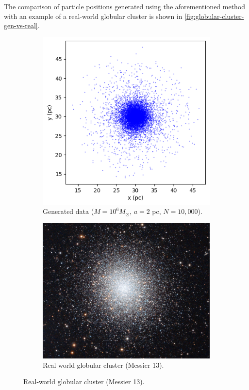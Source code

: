 The comparison of particle positions generated using the aforementioned method with an example of a real-world globular cluster is shown in \autoref{fig:globular-cluster-gen-vs-real}.
\begin{figure}[htp]
    \centering
    \begin{subfigure}[b]{0.4\textwidth}
        \centering
        \includegraphics[width=\textwidth]{chapters/test-models/img/globular_generated.png}
        \caption{Generated data ($M=10^{6} M_\odot$, $a=2$ pc, $N=10,000$).}
        \label{fig:glob-cluster-model-generated}
    \end{subfigure}
    \hfill
    \begin{subfigure}[b]{0.4\textwidth}
        \centering
        \includegraphics[width=\textwidth]{chapters/test-models/img/glob_cluster_m13.jpg}
        \caption{Real-world globular cluster (Messier 13).}
        \label{fig:messier-13}
    \end{subfigure}


\end{figure}
